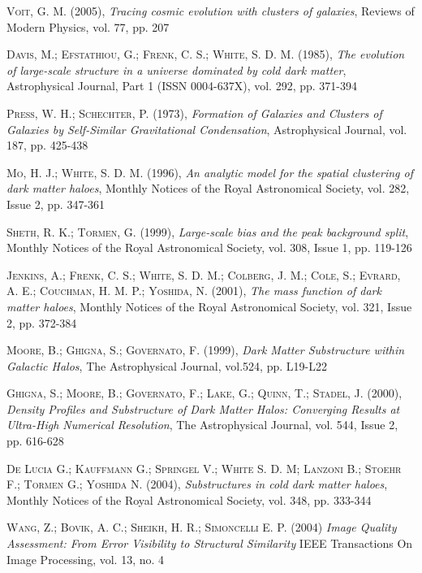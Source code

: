 \documentclass[a4paper,openright,12pt]{book}
\begin{document}
\begin{thebibliography}{a}
 \textsc{Voit, G. M. (2005)},
\textit{Tracing cosmic evolution with clusters of galaxies},
Reviews of Modern Physics, vol. 77, pp. 207 


 \textsc{Davis, M.; Efstathiou, G.; Frenk, C. S.; White, S. D. M. (1985)},
\textit{The evolution of large-scale structure in a universe dominated by cold dark matter},
Astrophysical Journal, Part 1 (ISSN 0004-637X), vol. 292, pp. 371-394 

 \textsc{Press, W. H.; Schechter, P. (1973)},
\textit{Formation of Galaxies and Clusters of Galaxies by Self-Similar Gravitational Condensation},
Astrophysical Journal, vol. 187, pp. 425-438

 \textsc{Mo, H. J.; White, S. D. M. (1996)},
\textit{An analytic model for the spatial clustering of dark matter haloes},
Monthly Notices of the Royal Astronomical Society, vol. 282, Issue 2, pp. 347-361

 \textsc{Sheth, R. K.; Tormen, G. (1999)},
\textit{Large-scale bias and the peak background split},
Monthly Notices of the Royal Astronomical Society, vol. 308, Issue 1, pp. 119-126

\textsc{Jenkins, A.; Frenk, C. S.; White, S. D. M.; Colberg, J. M.; Cole, S.; Evrard, A. E.; Couchman, H. M. P.; Yoshida, N. (2001)},
\textit{The mass function of dark matter haloes},
Monthly Notices of the Royal Astronomical Society, vol. 321, Issue 2, pp. 372-384


 \textsc{Moore, B.; Ghigna, S.; Governato, F. (1999)},
\textit{Dark Matter Substructure within Galactic Halos},
The Astrophysical Journal, vol.524, pp. L19-L22

 \textsc{Ghigna, S.; Moore, B.; Governato, F.; Lake, G.; Quinn, T.; Stadel, J. (2000)},
\textit{Density Profiles and Substructure of Dark Matter Halos: Converging Results at Ultra-High Numerical Resolution},
The Astrophysical Journal, vol. 544, Issue 2, pp. 616-628

 \textsc{De Lucia G.; Kauffmann G.; Springel V.; White S. D. M; Lanzoni B.; Stoehr F.; Tormen G.; Yoshida N. (2004)},
\textit{Substructures in cold dark matter haloes},
Monthly Notices of the Royal Astronomical Society, vol. 348, pp. 333-344




 \textsc{Wang, Z.; Bovik, A. C.; Sheikh, H. R.; Simoncelli E. P. (2004)}
\textit{Image Quality Assessment: From Error Visibility to Structural Similarity}
IEEE Transactions On Image Processing, vol. 13, no. 4
\end{thebibliography}
\end{document}
